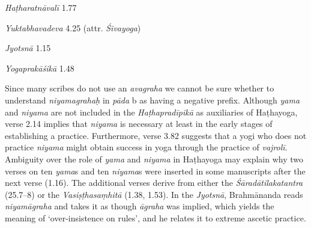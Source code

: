\begin{ekdosis}
\begin{testimonia}[hp01_015]
\emph{Haṭharatnāvalī} 1.77

\begin{versinnote}
\tl{\var{niyamagrahaḥ ] niyamāgrahaḥ N,J}\\!}
\end{versinnote}

\emph{Yuktabhavadeva} 4.25 (attr. \emph{Śivayoga})

\begin{versinnote}
\end{versinnote}

\emph{Jyotsnā} 1.15

\begin{versinnote}
\end{versinnote}

\emph{Yogaprakāśikā} 1.48

\begin{versinnote}
\end{versinnote}

\end{testimonia}

\begin{philcomm}[hp01_015]        
Since many scribes do not use an \emph{avagraha} we cannot be sure whether to understand  \emph{niyamagrahaḥ} in \emph{pāda} b as having a negative prefix. Although \emph{yama} and \emph{niyama} are not included in the \emph{Haṭhapradīpikā} as auxiliaries of Haṭhayoga, verse 2.14 implies that \emph{niyama} is necessary at least in the early stages of establishing a practice. Furthermore, verse 3.82 suggests that a yogi who does not practice \emph{niyama} might obtain success in yoga through the practice of \textit{vajrolī}. Ambiguity over the role of \emph{yama} and \emph{niyama} in Haṭhayoga may explain why two verses on ten \emph{yama}s and ten \emph{niyama}s were inserted in some manuscripts after the next verse (1.16). The additional verses derive from either the \emph{Śāradātilakatantra} (25.7–8) or the  \emph{Vasiṣṭhasaṃhitā} (1.38, 1.53). In the \emph{Jyotsnā}, Brahmānanda reads \emph{niyamāgraha} and takes it as though \emph{āgraha} was implied, which yields the meaning of ‘over-insistence on rules’, and he relates it to extreme ascetic practice.
\end{philcomm}


\end{ekdosis}
